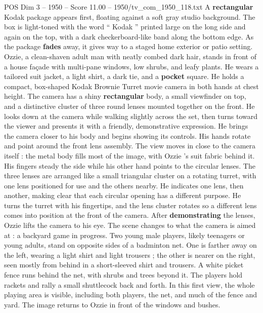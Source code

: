 \begin{textsample}{POS Dim 3 – 1950 – Score 11.00 – 1950/tv\_com\_1950\_118.txt}  \label{ex:f3_pos_018}
A \textbf{rectangular} Kodak package appears first, floating against a soft gray studio background.
The box is light-toned with the word “ Kodak ” printed large on the long side and again on the top, with a dark checkerboard-like band along the bottom edge.
As the package \textbf{fades} away, it gives way to a staged home exterior or patio setting.
Ozzie, a clean-shaven adult man with neatly combed dark hair, stands in front of a house façade with multi-pane windows, low shrubs, and leafy plants.
He wears a tailored suit jacket, a light shirt, a dark tie, and a \textbf{pocket} square.
He holds a compact, box-shaped Kodak Brownie Turret movie camera in both hands at chest height.
The camera has a shiny \textbf{rectangular} body, a small viewfinder on top, and a distinctive cluster of three round lenses mounted together on the front.
He looks down at the camera while walking slightly across the set, then turns toward the viewer and presents it with a friendly, demonstrative expression.
He brings the camera closer to his body and begins showing its controls.
His hands rotate and point around the front lens assembly.
The view moves in close to the camera itself : the metal body fills most of the image, with Ozzie ’s suit fabric behind it.
His fingers steady the side while his other hand points to the circular lenses.
The three lenses are arranged like a small triangular cluster on a rotating turret, with one lens positioned for use and the others nearby.
He indicates one lens, then another, making clear that each circular opening has a different purpose.
He turns the turret with his fingertips, and the lens cluster rotates so a different lens comes into position at the front of the camera.
After \textbf{demonstrating} the lenses, Ozzie lifts the camera to his eye.
The scene changes to what the camera is aimed at : a backyard game in progress.
Two young male players, likely teenagers or young adults, stand on opposite sides of a badminton net.
One is farther away on the left, wearing a light shirt and light trousers ; the other is nearer on the right, seen mostly from behind in a short-sleeved shirt and trousers.
A white picket fence runs behind the net, with shrubs and trees beyond it.
The players hold rackets and rally a small shuttlecock back and forth.
In this first view, the whole playing area is visible, including both players, the net, and much of the fence and yard.
The image returns to Ozzie in front of the windows and bushes.

\end{textsample}
